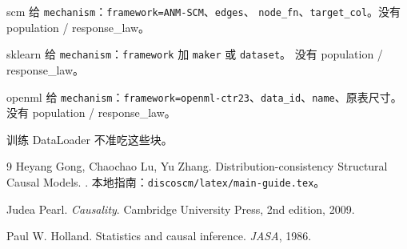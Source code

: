 \documentclass[11pt,a4paper,fontset=none]{ctexart}
\begin{document}
scm 给 \texttt{mechanism}：\texttt{framework=ANM-SCM}、\texttt{edges}、
\texttt{node\_fn}、\texttt{target\_col}。没有 population / response\_law。

sklearn 给 \texttt{mechanism}：\texttt{framework} 加 \texttt{maker} 或 \texttt{dataset}。
没有 population / response\_law。

openml 给 \texttt{mechanism}：\texttt{framework=openml-ctr23}、\texttt{data\_id}、\texttt{name}、原表尺寸。
没有 population / response\_law。

训练 DataLoader 不准吃这些块。

\begin{thebibliography}{9}
Heyang Gong, Chaochao Lu, Yu Zhang.
\newblock Distribution-consistency Structural Causal Models.
.
\newblock 本地指南：\texttt{discoscm/latex/main-guide.tex}。

Judea Pearl.
\newblock \emph{Causality}.
\newblock Cambridge University Press, 2nd edition, 2009.

Paul W. Holland.
\newblock Statistics and causal inference.
\newblock \emph{JASA}, 1986.
\end{thebibliography}
\end{document}
